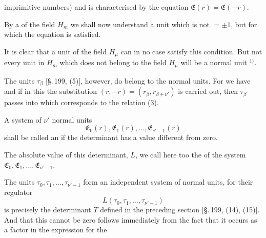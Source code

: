 imprimitive numbers) and is characterised by the equation $\mathfrak{E}(r)
= \mathfrak{E}(-r)$.

By a  of the field $H_m$ we shall now understand a
unit which is not $= \pm 1$, but for which the equation
is satisfied.

It is clear that a unit of the field $H_\mu$ can in no case satisfy
this condition. But not every unit in $H_m$ which does not belong
to the field $H_\mu$ will be a normal unit $^{1)}$.

The units $\tau_\beta$ [\S.\,199, (5)], however, do belong to the normal units.
For we have
and if in this the substitution $(r,-r) = (r_\beta, r_{\beta+\nu'})$ is carried
out, then $\tau_\beta$ passes into
which corresponds to the relation (3).

A system of $\nu'$ normal units
\[
\mathfrak{E}_0(r), \mathfrak{E}_1(r), \ldots, \mathfrak{E}_{\nu'-1}(r)
\]
shall be called an  if the determinant
has a value different from zero.

The absolute value of this determinant, $L$, we call here too
the  of the system $\mathfrak{E}_0, \mathfrak{E}_1, \ldots, \mathfrak{E}_{\nu'-1}$.

The units $\tau_0, \tau_1, \ldots, \tau_{\nu'-1}$ form an independent system
of normal units, for their regulator
\[
L(\tau_0, \tau_1, \ldots, \tau_{\nu'-1})
\]
is precisely the determinant $T$ defined in the preceding section
[\S.\,199, (14), (15)]. And that this cannot be zero follows
immediately from the fact that it occurs as a factor in the expression for the

\par{}
